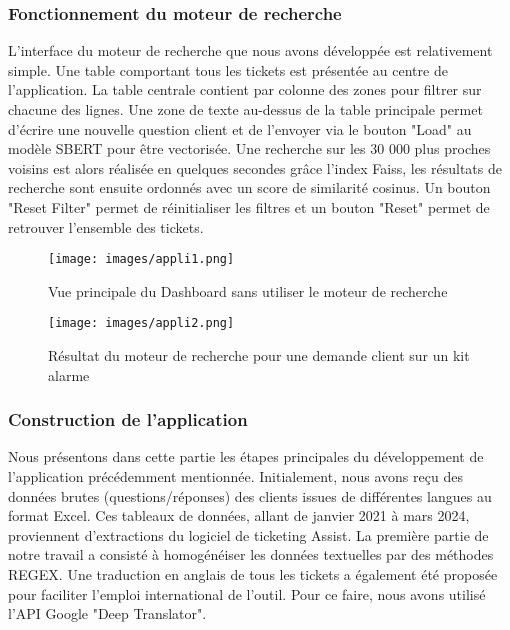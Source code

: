 \documentclass[12pt]{article}
\theoremstyle{definition}
\begin{document}
\subsubsection{Fonctionnement du moteur de recherche}

L'interface du moteur de recherche que nous avons développée est relativement simple. Une table comportant tous les tickets est présentée au centre de l’application. La table centrale contient par colonne des zones pour filtrer sur chacune des lignes. Une zone de texte au-dessus de la table principale permet d’écrire une nouvelle question client et de l'envoyer via le bouton "Load" au modèle SBERT pour être vectorisée. Une recherche sur les 30 000 plus proches voisins est alors réalisée en quelques secondes grâce l'index Faiss, les résultats de recherche sont ensuite ordonnés avec un score de similarité cosinus. Un bouton "Reset Filter" permet de réinitialiser les filtres et un bouton "Reset" permet de retrouver l’ensemble des tickets.

\begin{figure*}[!h]
	\centering
	\texttt{[image: images/appli1.png]}
	\caption{Vue principale du Dashboard sans utiliser le moteur de recherche}
\end{figure*}


\begin{figure*}[!h]
	\centering
	\texttt{[image: images/appli2.png]}
	\caption{Résultat du moteur de recherche pour une demande client sur un kit alarme}
\end{figure*}

\subsubsection{Construction de l'application}

Nous présentons dans cette partie les étapes principales du développement de l’application précédemment mentionnée. Initialement, nous avons reçu des données brutes (questions/réponses) des clients issues de différentes langues au format Excel. Ces tableaux de données, allant de janvier 2021 à mars 2024, proviennent d’extractions du logiciel de ticketing Assist. La première partie de notre travail a consisté à homogénéiser les données textuelles par des méthodes REGEX. Une traduction en anglais de tous les tickets a également été proposée pour faciliter l'emploi international de l'outil. Pour ce faire, nous avons utilisé l’API Google "Deep Translator".

\newpage 
\end{document}
